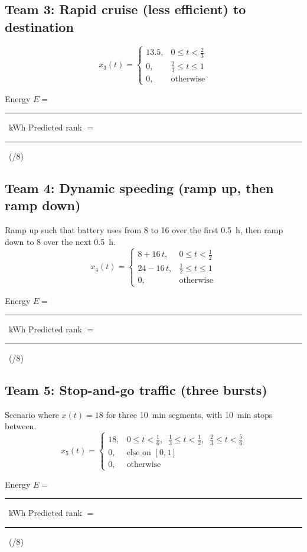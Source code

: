 \documentclass{ee102_notes}
\newcommand{\Eblank}{\rule{3cm}{0.4pt}}
\newcommand{\Rankblank}{\rule{3cm}{0.4pt}}
\begin{document}
\subsection*{Team 3: Rapid cruise (less efficient) to destination}
\[
x_3(t)=
\begin{cases}
13.5, & 0 \le t < \tfrac{2}{3} \\
0,    & \tfrac{2}{3} \le t \le 1 \\
0,    & \text{otherwise}
\end{cases}
\]
\begin{tcolorbox}[title=Team 3: Record your results]
Energy \(E=\) \Eblank\ \si{kWh} \quad\quad Predicted rank \(=\) \Rankblank\ (/8)
\end{tcolorbox}

\subsection*{Team 4: Dynamic speeding (ramp up, then ramp down)}
Ramp up such that battery uses from 8 to 16 over the first \SI{0.5}{h}, then ramp down to 8 over the next \SI{0.5}{h}.
\[
x_4(t)=
\begin{cases}
8 + 16\,t, & 0 \le t < \tfrac{1}{2} \\
24 - 16\,t, & \tfrac{1}{2} \le t \le 1 \\
0, & \text{otherwise}
\end{cases}
\]
\begin{tcolorbox}[title=Team 4: Record your results]
Energy \(E=\) \Eblank\ \si{kWh} \quad\quad Predicted rank \(=\) \Rankblank\ (/8)
\end{tcolorbox}

\subsection*{Team 5: Stop-and-go traffic (three bursts)}
Scenario where $x(t) = 18$ for three \SI{10}{min} segments, with \SI{10}{min} stops between.
\[
x_5(t)=
\begin{cases}
18, & 0 \le t < \tfrac{1}{6}, \;\;\tfrac{1}{3}\le t < \tfrac{1}{2}, \;\;\tfrac{2}{3}\le t < \tfrac{5}{6} \\
0,  & \text{else on }[0,1]\\
0,  & \text{otherwise}
\end{cases}
\]
\begin{tcolorbox}[title=Team 5: Record your results]
Energy \(E=\) \Eblank\ \si{kWh} \quad\quad Predicted rank \(=\) \Rankblank\ (/8)
\end{tcolorbox}
\end{document}
